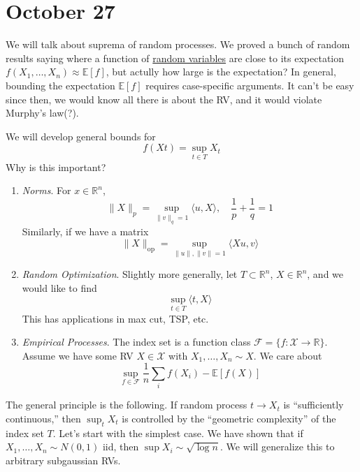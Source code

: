 \section{October 27}

We will talk about suprema of random processes. We proved a bunch of random results saying where a function of \hyperref[prob-def:random-variable]{random variables} are close to its expectation $f(X_1, \ldots, X_n) \approx \mathbb{E}[f]$, but actully how large is the expectation? In general, bounding the expectation $\mathbb{E}[f]$ requires case-specific arguments. It can't be easy since then, we would know all there is about the RV, and it would violate Murphy's law(?). 

We will develop general bounds for 
\begin{equation}
	f(Xt) = \sup_{t \in T} X_t
\end{equation}
Why is this important? 
\begin{enumerate}
	\item \textit{Norms}. For $x \in \mathbb{R}^n$, 
		\begin{equation}
			\|X\|_p = \sup_{\|v\|_q = 1} \langle u, X \rangle, \quad \frac{1}{p} + \frac{1}{q} = 1
		\end{equation}
		Similarly, if we have a matrix
		\begin{equation}
			\|X\|_{\mathrm{op}} = \sup_{\|u\|, \|v\| = 1} \langle X u, v \rangle
		\end{equation}

	\item \textit{Random Optimization}. Slightly more generally, let $T \subset \mathbb{R}^n$, $X \in \mathbb{R}^n$, and we would like to find 
		\begin{equation}
			\sup_{t \in T} \langle t, X \rangle
		\end{equation}
		This has applications in max cut, TSP, etc. 

	\item \textit{Empirical Processes}. The index set is a function class $\mathcal{F} = \{f : \mathcal{X} \to \mathbb{R} \}$. Assume we have some RV $X \in \mathcal{X}$ with $X_1, \ldots, X_n \sim X$. We care about 
		\begin{equation}
			\sup_{f \in \mathcal{F}} \frac{1}{n} \sum_i f(X_i) - \mathbb{E}[f(X)]
		\end{equation}
\end{enumerate}

The general principle is the following. If random process $t \to X_t$ is ``sufficiently continuous,'' then $\sup_t X_t$ is controlled by the ``geometric complexity'' of the index set $T$. Let's start with the simplest case. We have shown that if $X_1, \ldots, X_n \sim N(0, 1)$ iid, then $\sup{X_i} \sim \sqrt{\log{n}}$. We will generalize this to arbitrary subgaussian RVs. 

